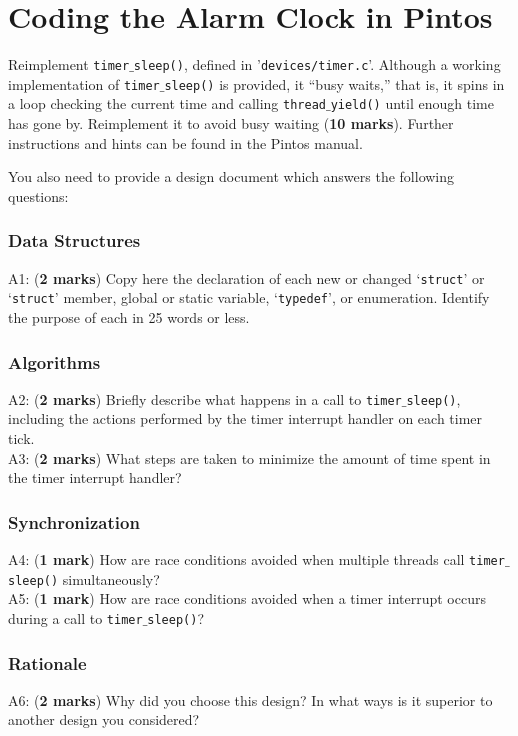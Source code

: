 \documentclass[a4paper,12pt]{article}
\begin{document}
\section*{Coding the Alarm Clock in Pintos}
Reimplement \texttt{timer$\_$sleep()}, defined in '\texttt{devices/timer.c}’.
Although a working implementation of \texttt{timer$\_$sleep()} is provided, it “busy waits,” that is, it spins in a loop checking the current time and calling \texttt{thread$\_$yield()} until enough time has gone by.
Reimplement it to avoid busy waiting ({\bf 10 marks}).
Further instructions and hints can be found in the Pintos manual.

You also need to provide a design document which answers the following questions:

\subsubsection*{Data Structures}
A1: ({\bf 2 marks}) Copy here the declaration of each new or changed `\texttt{struct}' or `\texttt{struct}' member, global or static variable, `\texttt{typedef}', or enumeration. Identify the purpose of each in 25 words or less.

\subsubsection*{Algorithms}
A2: ({\bf 2 marks}) Briefly describe what happens in a call to \texttt{timer$\_$sleep()}, including the actions performed by the timer interrupt handler on each timer tick. \\
A3: ({\bf 2 marks}) What steps are taken to minimize the amount of time spent in the timer interrupt handler?

\subsubsection*{Synchronization}
A4: ({\bf 1 mark}) How are race conditions avoided when multiple threads call \texttt{timer$\_$sleep()} simultaneously? \\
A5: ({\bf 1 mark}) How are race conditions avoided when a timer interrupt occurs during a call to \texttt{timer$\_$sleep()}?

\subsubsection*{Rationale}
A6: ({\bf 2 marks}) Why did you choose this design?
In what ways is it superior to another design you considered?
\end{document}
